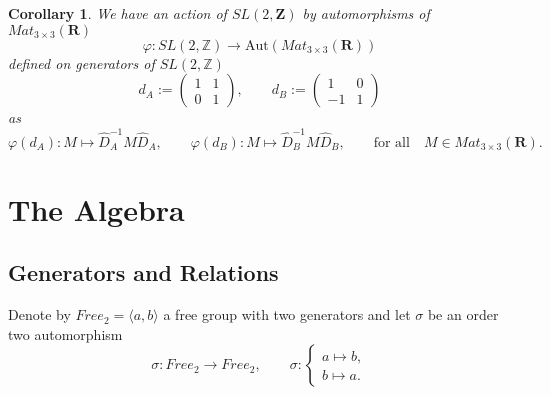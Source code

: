 \documentclass{amsart}
\newtheorem{corollary}[theorem]{Corollary}
\begin{document}
\begin{corollary}
    We have an action of $SL(2,\mathbf Z)$ by automorphisms of $Mat_{3\times 3}(\mathbf R)$
    \begin{equation*}
    \varphi:SL(2,\mathbb Z)\rightarrow \mathrm{Aut}\left(Mat_{3\times3}(\mathbf R)\right)
    \end{equation*}
    defined on generators of $SL(2,\mathbb Z)$
    \begin{equation*}
        d_A:=\left(\begin{array}{cc}1&1\\0&1\end{array}\right),\qquad d_B:=\left(\begin{array}{cc}1&0\\-1&1\end{array}\right)
    \end{equation*}
    as
    \begin{equation*}
    \varphi(d_A):M\mapsto \widehat D_A^{-1}M\widehat D_A,\qquad \varphi(d_B):M\mapsto \widehat D_B^{-1}M\widehat D_B,\qquad\textrm{for all}\quad M\in Mat_{3\times3}(\mathbf R).
    \end{equation*}
\end{corollary}

\section{The Algebra}
\label{sec:AlgebraK2}
\subsection{Generators and Relations}
Denote by $Free_2=\langle a,b\rangle$ a free group with two generators and let $\sigma$ be an order two automorphism
\begin{equation*}
\sigma:Free_2\rightarrow Free_2,\qquad \sigma:\left\{\begin{array}{l}a\mapsto b,\\b\mapsto a.\end{array}\right.
\end{equation*}
\end{document}
